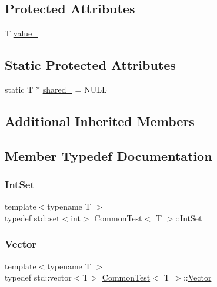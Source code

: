 \subsection*{Protected Attributes}
\begin{DoxyCompactItemize}
\item 
T \mbox{\hyperlink{classCommonTest_ae59c4abcb833625a7baeb2048531ebec}{value\+\_\+}}
\end{DoxyCompactItemize}
\subsection*{Static Protected Attributes}
\begin{DoxyCompactItemize}
\item 
static T $\ast$ \mbox{\hyperlink{classCommonTest_a52368ce1e65a865db9bdccbcc2cedaac}{shared\+\_\+}} = N\+U\+LL
\end{DoxyCompactItemize}
\subsection*{Additional Inherited Members}


\subsection{Member Typedef Documentation}
\mbox{\label{classCommonTest_a62827e9d3064cddf4a8698747f1bd434}} 
\subsubsection{\texorpdfstring{IntSet}{IntSet}}
{\footnotesize\ttfamily template$<$typename T $>$ \\
typedef std\+::set$<$int$>$ \mbox{\hyperlink{classCommonTest}{Common\+Test}}$<$ T $>$\+::\mbox{\hyperlink{classCommonTest_a62827e9d3064cddf4a8698747f1bd434}{Int\+Set}}\hspace{0.3cm}{\ttfamily [protected]}}

\mbox{\label{classCommonTest_a6dfdcede6964887b9f4254a0e0478e37}} 
\subsubsection{\texorpdfstring{Vector}{Vector}}
{\footnotesize\ttfamily template$<$typename T $>$ \\
typedef std\+::vector$<$T$>$ \mbox{\hyperlink{classCommonTest}{Common\+Test}}$<$ T $>$\+::\mbox{\hyperlink{classCommonTest_a6dfdcede6964887b9f4254a0e0478e37}{Vector}}\hspace{0.3cm}{\ttfamily [protected]}}



